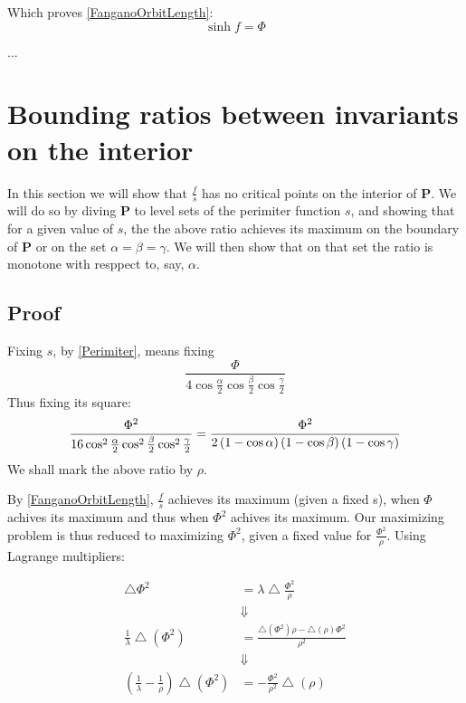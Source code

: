 \documentclass[a4paper,10pt]{article}
\begin{document}
Which proves \eqref{FanganoOrbitLength}:
\[
\sinh{f}=\Phi
\]

...

\section{Bounding ratios between invariants on the interior}

In this section we will show that ${\frac{f}{s}}$ has no critical points
on the interior of $\mathbf{P}$. We will do so by diving $\mathbf{P}$ to
level sets of the perimiter function $s$, and showing that for a given value of 
$s$, the the above ratio achieves its maximum on the boundary of $\mathbf{P}$ 
or on the set $\alpha=\beta=\gamma$. We will then show that on that set 
the ratio is monotone with resppect to, say, $\alpha$.

\subsection{Proof}

Fixing $s$, by \eqref{Perimiter}, means fixing
\[
\frac{\Phi}{4\cos{\frac{\alpha}{2}}\cos{\frac{\beta}{2}}\cos{\frac{\gamma}{2}}}
\]
Thus fixing its square: 
\[
\frac{\Phi^2}{16\cos^2{\frac{\alpha}{2}}\cos^2{\frac{\beta}{2}}\cos^2{\frac{\gamma}{2}}} = \\
\frac{\Phi^2}{2\left(1 - \cos{\alpha}\right)\left(1 - \cos{\beta}\right)\left(1 - \cos{\gamma}\right)}
\]
We shall mark the above ratio by $\rho$.

By \eqref{FanganoOrbitLength}, ${\frac{f}{s}}$ achieves its maximum (given a fixed s),
when ${\Phi}$ achives its maximum and thus when ${\Phi^2}$ achives its maximum. Our 
maximizing problem is thus reduced to maximizing $\Phi^2$, given a fixed value for
$\frac{\Phi^2}{\rho}$. Using Lagrange multipliers:

\begin{align*}
\bigtriangleup \Phi^2 &= \lambda \bigtriangleup\frac{\Phi^2}{\rho}\\
&\Downarrow\\
\frac{1}{\lambda}\bigtriangleup\left(\Phi^2\right) &= \frac{\bigtriangleup\left(\Phi^2\right)\rho - \bigtriangleup\left(\rho\right)\Phi^2}{\rho^2}\\
&\Downarrow\\
\left(\frac{1}{\lambda}-\frac{1}{\rho}\right)\bigtriangleup\left(\Phi^2\right) &= -\frac{\Phi^2}{\rho^2}\bigtriangleup\left(\rho\right)\\
\end{align*}
\end{document}
